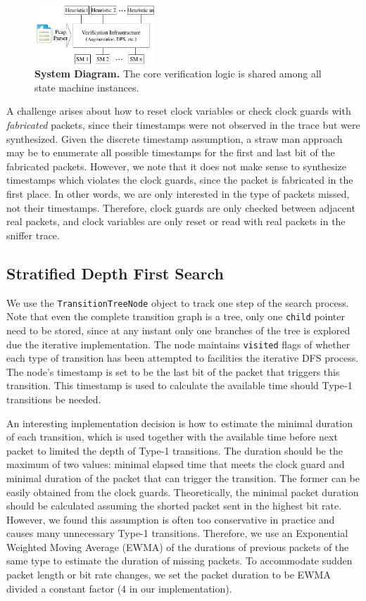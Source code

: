 \begin{figure}[t!]
  \centering
  \includegraphics[width=0.4\textwidth]{./figures/system.pdf}
  \caption{\textbf{System Diagram.} The core verification logic is shared among all state
  machine instances.}
  \label{fig:system}
\end{figure}


A challenge arises about how to reset clock variables or check clock guards
with \textit{fabricated} packets, since their timestamps were not observed in
the trace but were synthesized. Given the discrete timestamp assumption, a straw
man approach may be to enumerate all possible timestamps for the
first and last bit of the fabricated packets. However, we note that it does not
make sense to synthesize timestamps which violates the clock guards, since the
packet is fabricated in the first place. In other words, we are only interested
in the type of packets missed, not their timestamps. Therefore, clock guards are
only checked between adjacent real packets, and clock variables are only reset
or read with real packets in the sniffer trace.


\subsection{Stratified Depth First Search}

We use the \texttt{TransitionTreeNode} object to track one step of the search
process.
%
Note that even the complete transition graph is a tree, only one \texttt{child}
pointer need to be stored, since at any instant only one branches of the tree is
explored due the iterative implementation.
%
The node maintains \texttt{visited}
flags of whether
each type of transition has been attempted to facilities the iterative DFS
process.
%
The node's timestamp is set to be the last bit of the packet that
triggers this transition.
%
This timestamp is used to calculate the available time should Type-1 transitions
be needed.

An interesting implementation decision is how to estimate the minimal duration
of each transition, which is used together with the available time before next
packet to limited the depth of Type-1 transitions. The duration should be the
maximum of two values: minimal elapsed time that meets the clock guard and
minimal duration of the packet that can trigger the transition. The former can
be easily obtained from the clock guards. Theoretically, the minimal packet
duration should be calculated assuming the shorted packet sent in the highest
bit rate. However, we found this assumption is often too conservative in
practice and causes many unnecessary Type-1 transitions. Therefore, we use an
Exponential Weighted Moving Average (EWMA) of the durations of previous packets
of the same type to estimate the duration of missing packets. To
accommodate sudden packet length or bit rate changes, we set the packet
duration to be EWMA divided a constant factor (4 in our implementation).

